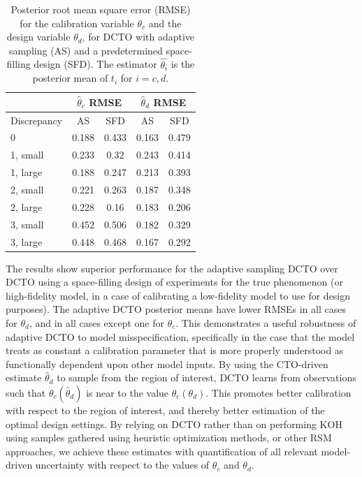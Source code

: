 \documentclass[12pt]{article}
\begin{document}
\begin{table}[]
	\centering
	\begin{tabular}{l|cc|cc}
		&\multicolumn{2}{c|}{$\widehat\theta_c$ RMSE}&
		\multicolumn{2}{c}{$\widehat\theta_d$ RMSE} \\ \hline
		Discrepancy    & AS   & SFD & AS    & SFD   \\ \hline
		0              & 0.188 & 0.433 & 0.163 & 0.479\\ \hline
		1, small       & 0.233 & 0.32 & 0.243 & 0.414\\ \hline
		1, large       & 0.188 & 0.247 & 0.213 & 0.393\\ \hline
		2, small       & 0.221 & 0.263 & 0.187 & 0.348\\ \hline
		2, large       & 0.228 & 0.16 & 0.183 & 0.206\\ \hline
		3, small       & 0.452 & 0.506 & 0.182 & 0.329\\ \hline
		3, large       & 0.448 & 0.468 & 0.167 & 0.292\\ \hline
	\end{tabular}
	\caption{Posterior root mean square error (RMSE) for the calibration variable $\theta_c$ and the design variable $\theta_d$, for DCTO with adaptive sampling (AS) and a predetermined space-filling design (SFD). The estimator $\widehat{\theta_i}$ is the posterior mean of $t_i$ for $i=c,d$.} 
	\label{table:vars_and_rmses}
\end{table}
%

%
The results show superior performance for the adaptive sampling DCTO over DCTO using a space-filling design of experiments for the true phenomenon (or high-fidelity model, in a case of calibrating a low-fidelity model to use for design purposes).
%
The adaptive DCTO posterior means have lower RMSEs in all cases for $\theta_d$, and in all cases except one for $\theta_c$.
%
This demonstrates a useful robustness of adaptive DCTO to model misspecification, specifically in the case that the model treats as constant a calibration parameter that is more properly understood as functionally dependent upon other model inputs.
%
By using the CTO-driven estimate $\widehat\theta_d$ to sample from the region of interest, DCTO learns from observations such that $\theta_c(\widehat\theta_d)$ is near to the value $\theta_c(\theta_d)$.
%
This promotes better calibration with respect to the region of interest, and thereby better estimation of the optimal design settings.
%
By relying on DCTO rather than on performing KOH using samples gathered using heuristic optimization methods, or other RSM approaches, we achieve these estimates with quantification of all relevant model-driven uncertainty with respect to the values of $\theta_c$ and $\theta_d$.
%
\end{document}
